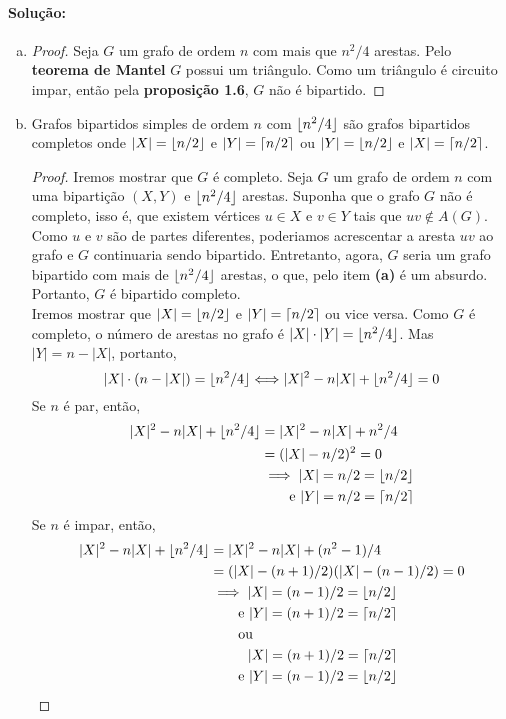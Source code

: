 \documentclass[11pt,a4paper,notitlepage]{exam}
\DeclarePairedDelimiter{\ceil}{\lceil}{\rceil}
\DeclarePairedDelimiter{\floor}{\lfloor}{\rfloor}
\begin{document}
\paragraph*{Solução:}
\begin{enumerate}[(a)]
  \item 
  \begin{proof}
    Seja $G$ um grafo de ordem $n$ com mais que $n^2/4$ arestas. Pelo \textbf{teorema de Mantel} $G$ possui um triângulo. Como um triângulo é circuito impar, então pela \textbf{proposição 1.6}, $G$ não é bipartido.
  \end{proof}
  \item Grafos bipartidos simples de ordem $n$ com $\floor{n^2/4}$ são grafos bipartidos completos onde $|X| = \floor{n/2}$ e $|Y| = \ceil{n/2}$ ou $|Y| = \floor{n/2}$ e $|X| = \ceil{n/2}$.
  \begin{proof}
    Iremos mostrar que $G$ é completo. Seja $G$ um grafo de ordem $n$ com uma bipartição $(X, Y)$ e $\floor{n^2/4}$ arestas. Suponha que o grafo $G$ não é completo, isso é, que existem vértices $u \in X$ e $v \in Y$ tais que $uv \notin A(G)$. Como $u$ e $v$ são de partes diferentes, poderiamos acrescentar a aresta $uv$ ao grafo e $G$ continuaria sendo bipartido. Entretanto, agora, $G$ seria um grafo bipartido com mais de $\floor{n^2/4}$ arestas, o que, pelo item \textbf{(a)} é um absurdo. Portanto, $G$ é bipartido completo.\\
    Iremos mostrar que $|X| = \floor{n/2}$ e $|Y| = \ceil{n/2}$ ou vice versa. Como $G$ é completo, o número de arestas no grafo é $|X|\cdot|Y| = \floor{n^2/4}$. Mas $|Y| = n - |X|$, portanto, 
    $$
    |X|\cdot(n - |X|) = \floor{n^2/4} \Longleftrightarrow |X|^2 - n|X| + \floor{n^2/4} = 0
    $$
    Se $n$ é par, então,
    \begin{align*}
      |X|^2 - n|X| + \floor{n^2/4} &= |X|^2 - n|X| + n^2/4\\ 
      &= (|X|-n/2)^2 = 0\\
      &\implies |X| = n/2 = \floor{n/2}\\
      &\hphantom{xxxi} \text{e } |Y| = n/2 = \ceil{n/2}
    \end{align*}
    Se $n$ é impar, então,
    \begin{align*}
      |X|^2 - n|X| + \floor{n^2/4} &= |X|^2 - n|X| + (n^2-1)/4\\ 
      &= (|X|-(n+1)/2)(|X|-(n-1)/2) = 0\\
      &\implies |X| = (n-1)/2 = \floor{n/2}\\
      &\hphantom{xxxi} \text{e } |Y| = (n+1)/2 = \ceil{n/2}\\
      &\hphantom{xxxi} \text{ou}\\
      &\hphantom{xxxxe} |X| = (n+1)/2 = \ceil{n/2}\\
      &\hphantom{xxxi} \text{e } |Y| = (n-1)/2 = \floor{n/2}\\
    \end{align*} 

  \end{proof}
\end{enumerate}
\end{document}
